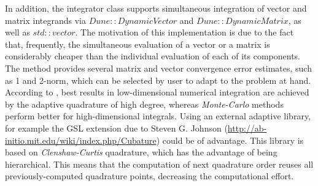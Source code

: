 \noindent
In addition, the integrator class supports simultaneous integration of vector and matrix integrands via $Dune::DynamicVector$ and $Dune::DynamicMatrix$, as well as $std::vector$. The motivation of this implementation is due to the fact that, frequently, the simultaneous evaluation of a vector or a matrix is considerably cheaper than the individual evaluation of each of its components. The method provides several matrix and vector convergence error estimates, such as 1 and 2-norm, which can be selected by user to adapt to the problem at hand.\\

\noindent
According to \cite{schurer2003}, best results in low-dimensional numerical integration are achieved by the adaptive quadrature of high degree, whereas \textit{Monte-Carlo} methods perform better for high-dimensional integrals. Using an external adaptive library, for example the GSL extension due to Steven G. Johnson (\url{http://ab-initio.mit.edu/wiki/index.php/Cubature}) could be of advantage. This library is based on \textit{Clenshaw-Curtis} quadrature, which has the advantage of being hierarchical. This means that the computation of next quadrature order reuses all previously-computed quadrature points, decreasing the computational effort.

